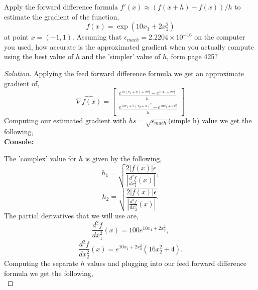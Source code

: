 \documentclass[12pt]{article}
\makeatletter
\theoremstyle{homework}
\newenvironment{exercise}[1]
{\def\@currentlabel{#1}\exercisecore}
{\endexercisecore}
\makeatother
\begin{document}
\vspace{.5in}


\begin{exercise}{P18} Apply the forward difference formula $f'(x) \approx (f(x + h) - f(x))/h$
  to estimate the gradient of the function, 
  \begin{equation*}
    f(x) = \exp(10x_1 + 2x_2^2)
  \end{equation*}
  at point $x = (-1, 1)$. Assuming that $\epsilon_{mach} = 2.2204 \times 10^{-16}$ on the computer 
  you used, how accurate is the approximated gradient when you actually compute using the best value of $h$ and the 'simpler'
  value of $h$, form page 425?
  \begin{proof}[Solution] Applying the feed forward difference formula we get an approximate gradient of, 
    \begin{equation*}
      \hat{\nabla f(x)} = 
      \begin{bmatrix}
        \frac{e^{10(x_1 + h) + 2x_2^2} - e^{10x_1 + 2x_2^2}}{h}\\
        \frac{e^{10x_1 + 2(x_2+h)^2} - e^{10x_1 + 2x_2^2}}{h}
      \end{bmatrix}
    \end{equation*}
    Computing our estimated gradient with $hs = \sqrt{\epsilon_{mach}}$(simple h) value we get the following, \\

      \textbf{Console:}
      \begin{center}
        
      \end{center}
    The 'complex' value for $h$ is given by the following, 
    \begin{equation*}
      h_1 = \sqrt{\frac{2|f(x)|\epsilon}{|\frac{d^2f}{dx_1^2}(x)|}},
    \end{equation*}
    \begin{equation*}
      h_2 = \sqrt{\frac{2|f(x)|\epsilon}{|\frac{d^2f}{dx_2^2}(x)|}}.
    \end{equation*}
    The partial derivatives that we will use are, 
    \begin{equation*}
      \frac{d^2f}{dx_1^2}(x) = 100e^{10x_1 + 2x_2^2},
    \end{equation*}
    \begin{equation*}
      \frac{d^2f}{dx_2^2}(x) = e^{10x_1 + 2x_2^2}(16x_2^2 + 4).
    \end{equation*}
    Computing the separate $h$ values and plugging into our feed forward difference formula we get the following,\\


\end{proof}
\end{exercise}
\end{document}
